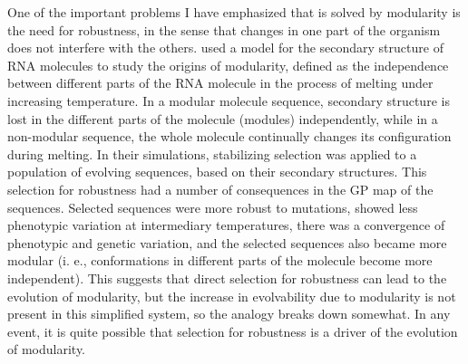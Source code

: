 \begin{refsection}
One of the important problems I have emphasized that is solved by
modularity is the need for robustness, in the sense that changes in one
part of the organism does not interfere with the others. \textcite{Ancel2000-vt} 
used a model for the secondary structure of
RNA molecules to study the origins of modularity, defined as the
independence between different parts of the RNA molecule in the process
of melting under increasing temperature. In a modular molecule sequence,
secondary structure is lost in the different parts of the molecule
(modules) independently, while in a non-modular sequence, the whole
molecule continually changes its configuration during melting. In their
simulations, stabilizing selection was applied to a population of
evolving sequences, based on their secondary structures. This selection
for robustness had a number of consequences in the GP map of the
sequences. Selected sequences were more robust to mutations, showed less
phenotypic variation at intermediary temperatures, there was a
convergence of phenotypic and genetic variation, and the selected
sequences also became more modular (i. e., conformations in different
parts of the molecule become more independent). This suggests that
direct selection for robustness can lead to the evolution of modularity,
but the increase in evolvability due to modularity is not present in
this simplified system, so the analogy breaks down somewhat. In any
event, it is quite possible that selection for robustness is a driver of
the evolution of modularity.


\end{refsection}
